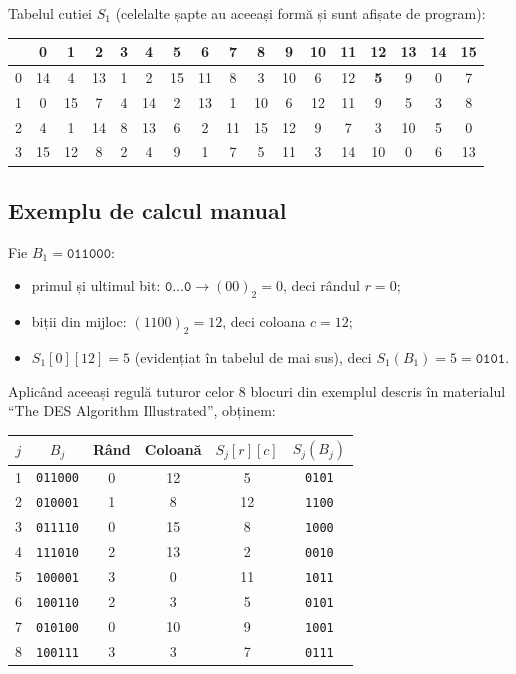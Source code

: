 \documentclass[12pt,a4paper]{article}
\begin{document}
Tabelul cutiei $S_1$ (celelalte șapte au aceeași formă și sunt afișate de program):
\begin{center}
\small
\renewcommand{\arraystretch}{1.2}
\setlength{\tabcolsep}{4pt}
\begin{tabular}{|c|*{16}{c|}}
\hline
 & 0 & 1 & 2 & 3 & 4 & 5 & 6 & 7 & 8 & 9 & 10 & 11 & 12 & 13 & 14 & 15 \\ \hline
0 & 14 & 4 & 13 & 1 & 2 & 15 & 11 & 8 & 3 & 10 & 6 & 12 & \textbf{5} & 9 & 0 & 7 \\ \hline
1 & 0 & 15 & 7 & 4 & 14 & 2 & 13 & 1 & 10 & 6 & 12 & 11 & 9 & 5 & 3 & 8 \\ \hline
2 & 4 & 1 & 14 & 8 & 13 & 6 & 2 & 11 & 15 & 12 & 9 & 7 & 3 & 10 & 5 & 0 \\ \hline
3 & 15 & 12 & 8 & 2 & 4 & 9 & 1 & 7 & 5 & 11 & 3 & 14 & 10 & 0 & 6 & 13 \\ \hline
\end{tabular}
\end{center}

\subsection{Exemplu de calcul manual}

Fie $B_1 = \texttt{011000}$:
\begin{itemize}
    \item primul și ultimul bit: $\texttt{0}\dots\texttt{0} \rightarrow
    (00)_2 = 0$, deci rândul $r = 0$;
    \item biții din mijloc: $(1100)_2 = 12$, deci coloana $c = 12$;
    \item $S_1[0][12] = 5$ (evidențiat în tabelul de mai sus), deci
    $S_1(B_1) = 5 = \texttt{0101}$.
\end{itemize}

Aplicând aceeași regulă tuturor celor 8 blocuri din exemplul descris în
materialul \enquote{The DES Algorithm Illustrated}, obținem:

\begin{center}
\renewcommand{\arraystretch}{1.2}
\begin{tabular}{@{}cccccc@{}}
\toprule
$j$ & $B_j$ & \textbf{Rând} & \textbf{Coloană} & $S_j[r][c]$ & $S_j(B_j)$ \\
\midrule
1 & \texttt{011000} & 0 & 12 & 5  & \texttt{0101} \\
2 & \texttt{010001} & 1 & 8  & 12 & \texttt{1100} \\
3 & \texttt{011110} & 0 & 15 & 8  & \texttt{1000} \\
4 & \texttt{111010} & 2 & 13 & 2  & \texttt{0010} \\
5 & \texttt{100001} & 3 & 0  & 11 & \texttt{1011} \\
6 & \texttt{100110} & 2 & 3  & 5  & \texttt{0101} \\
7 & \texttt{010100} & 0 & 10 & 9  & \texttt{1001} \\
8 & \texttt{100111} & 3 & 3  & 7  & \texttt{0111} \\
\bottomrule
\end{tabular}
\end{center}
\end{document}

